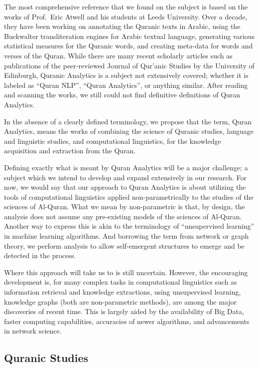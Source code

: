 \documentclass[
]{article}
\begin{document}
The most comprehensive reference that we found on the subject is based on the works of Prof.~Eric Atwell and his students at Leeds University. Over a decade, they have been working on annotating the Quranic texts in Arabic, using the Buckwalter transliteration engines for Arabic textual language, generating various statistical measures for the Quranic words, and creating meta-data for words and verses of the Quran. While there are many recent scholarly articles such as publications of the peer-reviewed Journal of Qur'anic Studies by the University of Edinburgh, Quranic Analytics is a subject not extensively covered; whether it is labeled as ``Quran NLP'', ``Quran Analytics'', or anything similar. After reading and scanning the works, we still could not find definitive definitions of Quran Analytics.

In the absence of a clearly defined terminology, we propose that the term, Quran Analytics, means the works of combining the science of Quranic studies, language and linguistic studies, and computational linguistics, for the knowledge acquisition and extraction from the Quran.

Defining exactly what is meant by Quran Analytics will be a major challenge; a subject which we intend to develop and expand extensively in our research. For now, we would say that our approach to Quran Analytics is about utilizing the tools of computational linguistics applied non-parametrically to the studies of the sciences of Al-Quran. What we mean by non-parametric is that, by design, the analysis does not assume any pre-existing models of the sciences of Al-Quran. Another way to express this is akin to the terminology of ``unsupervised learning'' in machine learning algorithms. And borrowing the term from network or graph theory, we perform analysis to allow self-emergent structures to emerge and be detected in the process.

Where this approach will take us to is still uncertain. However, the encouraging development is, for many complex tasks in computational linguistics such as information retrieval and knowledge extractions, using unsupervised learning, knowledge graphs (both are non-parametric methods), are among the major discoveries of recent time. This is largely aided by the availability of Big Data, faster computing capabilities, accuracies of newer algorithms, and advancements in network science.

\hypertarget{quranic-studies}{%
\subsection{Quranic Studies}\label{quranic-studies}}
\end{document}
